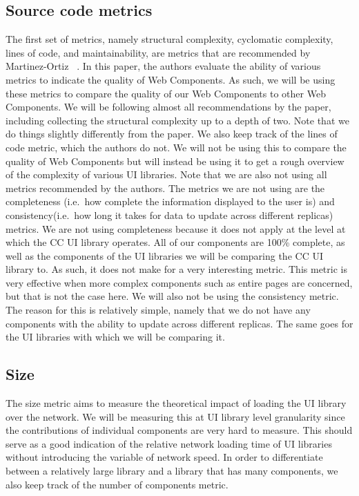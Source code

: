 \subsection{Source code metrics}
The first set of metrics, namely structural complexity, cyclomatic complexity, lines of code, and maintainability, are metrics that are recommended by Martinez-Ortiz \etal{}~\cite{martinez-ortiz2016quality}. In this paper, the authors evaluate the ability of various metrics to indicate the quality of Web Components. As such, we will be using these metrics to compare the quality of our Web Components to other Web Components. We will be following almost all recommendations by the paper, including collecting the structural complexity up to a depth of two. Note that we do things slightly differently from the paper. We also keep track of the lines of code metric, which the authors do not. We will not be using this to compare the quality of Web Components but will instead be using it to get a rough overview of the complexity of various UI libraries. Note that we are also not using all metrics recommended by the authors. The metrics we are not using are the completeness (i.e.~how complete the information displayed to the user is) and consistency(i.e.~how long it takes for data to update across different replicas) metrics. We are not using completeness because it does not apply at the level at which the CC UI library operates. All of our components are 100\% complete, as well as the components of the UI libraries we will be comparing the CC UI library to. As such, it does not make for a very interesting metric. This metric is very effective when more complex components such as entire pages are concerned, but that is not the case here. We will also not be using the consistency metric. The reason for this is relatively simple, namely that we do not have any components with the ability to update across different replicas. The same goes for the UI libraries with which we will be comparing it.

\subsection{Size}
The size metric aims to measure the theoretical impact of loading the UI library over the network. We will be measuring this at UI library level granularity since the contributions of individual components are very hard to measure. This should serve as a good indication of the relative network loading time of UI libraries without introducing the variable of network speed. In order to differentiate between a relatively large library and a library that has many components, we also keep track of the number of components metric.

